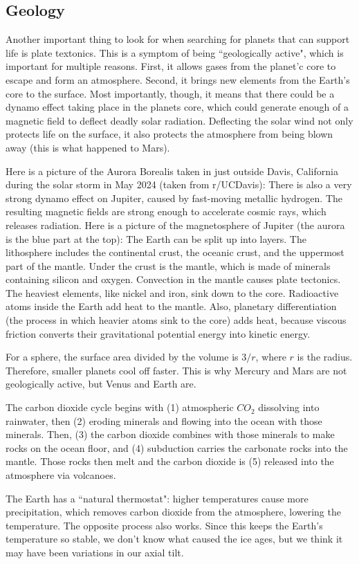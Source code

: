 \documentclass[class=article, crop=false]{standalone}
\begin{document}
\subsection{Geology}
Another important thing to look for when searching for planets that can support life is plate textonics. This is a symptom of being ``geologically active", which is important for multiple reasons. First, it allows gases from the planet'c core to escape and form an atmosphere. Second, it brings new elements from the Earth's core to the surface. Most importantly, though, it means that there could be a dynamo effect taking place in the planets core, which could generate enough of a magnetic field to deflect deadly solar radiation. Deflecting the solar wind not only protects life on the surface, it also protects the atmosphere from being blown away (this is what happened to Mars).
\par
Here is a picture of the Aurora Borealis taken in just outside Davis, California during the solar storm in May 2024 (taken from r/UCDavis):
There is also a very strong dynamo effect on Jupiter, caused by fast-moving metallic hydrogen. The resulting magnetic fields are strong enough to accelerate cosmic rays, which releases radiation. Here is a picture of the magnetosphere of Jupiter (the aurora is the blue part at the top):
The Earth can be split up into layers. The lithosphere includes the continental crust, the oceanic crust, and the uppermost part of the mantle. Under the crust is the mantle, which is made of minerals containing silicon and oxygen. Convection in the mantle causes plate tectonics. The heaviest elements, like nickel and iron, sink down to the core. Radioactive atoms inside the Earth add heat to the mantle. Also, planetary differentiation (the process in which heavier atoms sink to the core) adds heat, because viscous friction converts their gravitational potential energy into kinetic energy.
\par
For a sphere, the surface area divided by the volume is $3/r$, where $r$ is the radius. Therefore, smaller planets cool off faster. This is why Mercury and Mars are not geologically active, but Venus and Earth are.
\par
The carbon dioxide cycle begins with (1) atmospheric $CO_2$ dissolving into rainwater, then (2) eroding minerals and flowing into the ocean with those minerals. Then, (3) the carbon dioxide combines with those minerals to make rocks on the ocean floor, and (4) subduction carries the carbonate rocks into the mantle. Those rocks then melt and the carbon dioxide is (5) released into the atmosphere via volcanoes.
\par
The Earth has a ``natural thermostat": higher temperatures cause more precipitation, which removes carbon dioxide from the atmosphere, lowering the temperature. The opposite process also works. Since this keeps the Earth's temperature so stable, we don't know what caused the ice ages, but we think it may have been variations in our axial tilt.
\end{document}
